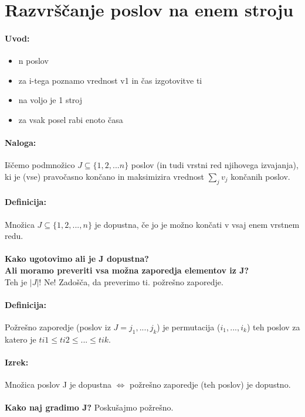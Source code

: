 \documentclass[a4paper,10pt]{article}
\begin{document}
\section{Razvr\v s\v canje poslov na enem stroju}

\paragraph{Uvod:}
\begin{itemize}
\item n poslov
\item za i-tega poznamo vrednost v1 in \v cas izgotovitve ti
\item na voljo je 1 stroj
\item za vsak posel rabi enoto \v casa
\end{itemize}

\paragraph{Naloga:}
I\v s\v cemo podmno\v zico $J \subseteq \{1, 2,... n\}$ poslov (in tudi vrstni red njihovega izvajanja), ki je (vse) pravo\v casno kon\v cano in maksimizira vrednost $\sum_{j}v_j$ kon\v canih poslov.

\paragraph{Definicija:}
Mno\v zica $J \subseteq \{1, 2, ...,n\}$ je dopustna, \v ce jo je mo\v zno kon\v cati v vsaj enem vrstnem redu.\\
\\
\textbf{Kako ugotovimo ali je J dopustna?\\
Ali moramo preveriti vsa mo\v zna zaporedja elementov iz J?}\\
Teh je $|J|$!
Ne! Zado\v s\v ca, da preverimo ti. po\v zre\v sno zaporedje.

\paragraph{Definicija:}
Po\v zre\v sno zaporedje (poslov iz $J = {j_1,...,j_k}$) je permutacija ($i_1,...,i_k$) teh poslov za katero je $ti1 \leq ti2 \leq ... \leq tik$.

\paragraph{Izrek:}
Mno\v zica poslov J je dopustna $\Leftrightarrow$ po\v zre\v sno zaporedje (teh poslov) je dopustno.\\
\\
\textbf{Kako naj gradimo J?} Posku\v sajmo po\v zre\v sno.
\end{document}
